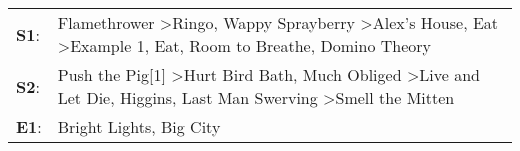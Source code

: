 \begin{supertabular}{p{0.03\textwidth}p{0.92\textwidth}}
 \textbf{S1}:  &  Flamethrower\textsuperscript{} \textgreater \enspace Ringo\textsuperscript{}, \enspace Wappy Sprayberry\textsuperscript{} \textgreater \enspace Alex's House\textsuperscript{}, \enspace Eat\textsuperscript{} \textgreater \enspace Example 1\textsuperscript{}, \enspace Eat\textsuperscript{}, \enspace Room to Breathe\textsuperscript{}, \enspace Domino Theory\textsuperscript{}  \enspace  \\
 \textbf{S2}:  &                                                   Push the Pig[1]\textsuperscript{} \textgreater \enspace Hurt Bird Bath\textsuperscript{}, \enspace Much Obliged\textsuperscript{} \textgreater \enspace Live and Let Die\textsuperscript{}, \enspace Higgins\textsuperscript{}, \enspace Last Man Swerving\textsuperscript{} \textgreater \enspace Smell the Mitten\textsuperscript{}  \enspace  \\
 \textbf{E1}:  &                                                                                                                                                                                                                                                                                                                                               Bright Lights, Big City\textsuperscript{}  \enspace  \\
\end{supertabular}
